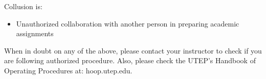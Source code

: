 \documentclass[12pt]{scrartcl}
\begin{document}
Collusion is:
\begin{itemize}
\item Unauthorized collaboration with another person in preparing academic assignments
\end{itemize}

\begin{tcolorbox}[colback=red!5,colframe=red!75!black,title=Important!]
When in doubt on any of the above, please contact your instructor to check if you are following authorized procedure. Also, please check the UTEP’s Handbook of Operating Procedures at: hoop.utep.edu. 
\end{tcolorbox}

\end{document}

